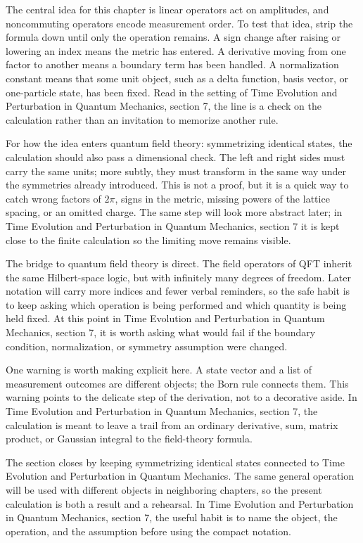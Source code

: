 The central idea for this chapter is linear operators act on amplitudes, and noncommuting operators encode measurement order.  To test that idea, strip the formula down until only the operation remains.  A sign change after raising or lowering an index means the metric has entered.  A derivative moving from one factor to another means a boundary term has been handled.  A normalization constant means that some unit object, such as a delta function, basis vector, or one-particle state, has been fixed.  Read in the setting of Time Evolution and Perturbation in Quantum Mechanics, section 7, the line is a check on the calculation rather than an invitation to memorize another rule.

For how the idea enters quantum field theory: symmetrizing identical states, the calculation should also pass a dimensional check.  The left and right sides must carry the same units; more subtly, they must transform in the same way under the symmetries already introduced.  This is not a proof, but it is a quick way to catch wrong factors of \(2\pi\), signs in the metric, missing powers of the lattice spacing, or an omitted charge.  The same step will look more abstract later; in Time Evolution and Perturbation in Quantum Mechanics, section 7 it is kept close to the finite calculation so the limiting move remains visible.

The bridge to quantum field theory is direct.  The field operators of QFT inherit the same Hilbert-space logic, but with infinitely many degrees of freedom.  Later notation will carry more indices and fewer verbal reminders, so the safe habit is to keep asking which operation is being performed and which quantity is being held fixed.  At this point in Time Evolution and Perturbation in Quantum Mechanics, section 7, it is worth asking what would fail if the boundary condition, normalization, or symmetry assumption were changed.

One warning is worth making explicit here.  A state vector and a list of measurement outcomes are different objects; the Born rule connects them.  This warning points to the delicate step of the derivation, not to a decorative aside.  In Time Evolution and Perturbation in Quantum Mechanics, section 7, the calculation is meant to leave a trail from an ordinary derivative, sum, matrix product, or Gaussian integral to the field-theory formula.

The section closes by keeping symmetrizing identical states connected to Time Evolution and Perturbation in Quantum Mechanics.  The same general operation will be used with different objects in neighboring chapters, so the present calculation is both a result and a rehearsal.  In Time Evolution and Perturbation in Quantum Mechanics, section 7, the useful habit is to name the object, the operation, and the assumption before using the compact notation.



